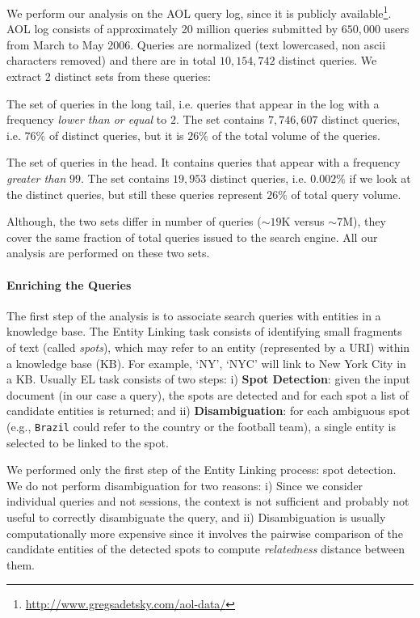 We perform our analysis on the AOL query log, since it is publicly available\footnote{\url{http://www.gregsadetsky.com/aol-data/}}. AOL log consists of approximately 20 million queries submitted by $650,000$ users from March to May 2006. Queries are normalized (text lowercased, non ascii characters removed) and there are in total $10,154,742$ distinct queries. 
We extract 2 distinct sets from these queries: 
\begin{description}
	\item{\tail{}} The set of queries in the long tail, i.e. queries that appear in the log with a frequency \emph{lower than or equal} to $2$. The set contains $7,746,607$ distinct queries, i.e. $76\%$ of distinct queries, but it is $26\%$ of the total volume of the queries.
	\item{\head{}} The set of queries in the head. It contains queries that appear with a frequency \emph{greater than} $99$. The set contains $19,953$ distinct queries, i.e. $0.002\%$ if we look at the distinct queries, but still these queries represent $26\%$ of total query volume.%
\end{description}
Although, the two sets differ in number of queries ($\sim19$K versus $\sim7$M), they cover the same fraction of total queries issued to the search engine. All our analysis are performed on these two sets.

\paragraph{Enriching the Queries}
The first step of the analysis is to associate search queries with entities in a knowledge base.  
The Entity Linking task consists of identifying small fragments of text (called
\emph{spots}), which may refer to an entity (represented by a URI) within a
knowledge base (KB). For example, `NY', `NYC' will link to New York City in a
KB.
Usually EL task consists of two steps: i) \textbf{Spot Detection}: given the input document (in our case a query), 
the spots are detected and for each spot a list of candidate entities is returned; and ii) \textbf{Disambiguation}:
for each ambiguous spot (e.g., \texttt{Brazil} could refer to the country or the
football team), a single entity is
selected to be linked to the spot.

We performed only the first step of the Entity Linking process: spot detection. 
We do not perform disambiguation for two reasons: i) Since we consider individual queries and not sessions, the context is not sufficient and probably not useful to correctly disambiguate the query, and ii) Disambiguation is usually computationally more expensive
since it involves the pairwise comparison of the candidate entities of the detected spots to compute \emph{relatedness}\cite{milne2008learning} distance between them. 

